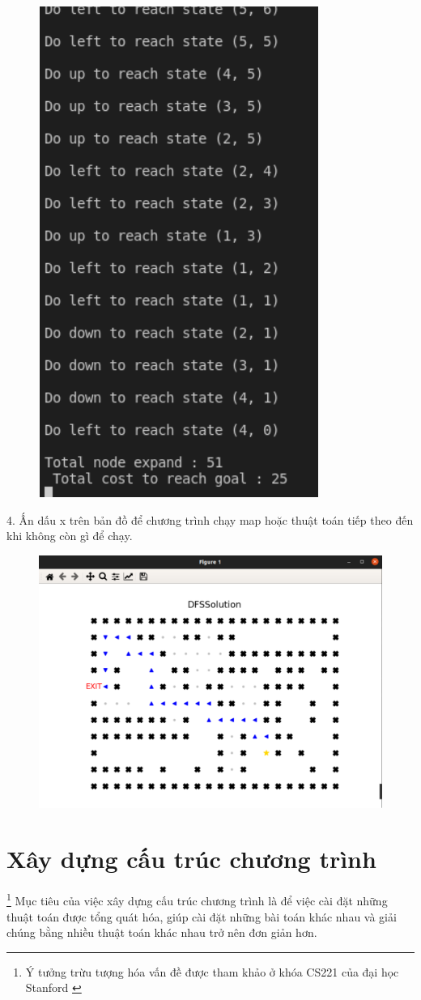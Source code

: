 \documentclass[11pt]{article} %
\begin{document}
\begin{figure}[h] 
	\centering
	\includegraphics[width=0.5\columnwidth]{Figures/hdsd_5.png}
\end{figure}

4. Ấn dấu x trên bản đồ để chương trình chạy map hoặc thuật toán tiếp theo đến khi không còn gì để chạy.\\
\newpage
\begin{figure}[h]
	\centering
	\includegraphics[width=0.5\columnwidth]{Figures/hssd_2.png}
\end{figure}
\section{Xây dựng cấu trúc chương trình} 
\footnote{Ý tưởng trừu tượng hóa vấn đề được tham khảo ở khóa CS221 của đại học Stanford \cite{standfordcs221}}
Mục tiêu của việc xây dựng cấu trúc chương trình là để việc cài đặt những thuật toán được tổng quát hóa, giúp cài đặt những bài toán khác nhau và giải chúng bằng nhiều thuật toán khác nhau trở nên đơn giản hơn. 
\end{document}
